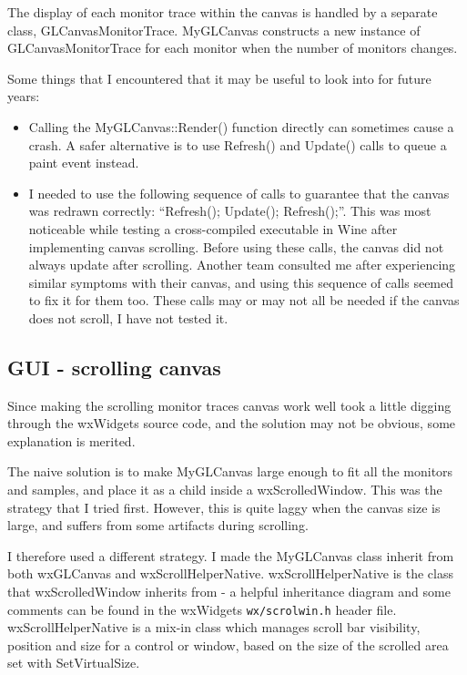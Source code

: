 \documentclass[a4paper,10pt]{article}
\begin{document}
The display of each monitor trace within the canvas is handled by a separate class, GLCanvasMonitorTrace. MyGLCanvas constructs a new instance of GLCanvasMonitorTrace for each monitor when the number of monitors changes. 

Some things that I encountered that it may be useful to look into for future years:
\begin{itemize}
 \item Calling the MyGLCanvas::Render() function directly can sometimes cause a crash. A safer alternative is to use Refresh() and Update() calls to queue a paint event instead. 
 \item I needed to use the following sequence of calls to guarantee that the canvas was redrawn correctly: ``Refresh(); Update(); Refresh();''. This was most noticeable while testing a cross-compiled executable in Wine after implementing canvas scrolling. Before using these calls, the canvas did not always update after scrolling. Another team consulted me after experiencing similar symptoms with their canvas, and using this sequence of calls seemed to fix it for them too. These calls may or may not all be needed if the canvas does not scroll, I have not tested it.
\end{itemize}

\subsection{GUI - scrolling canvas}
Since making the scrolling monitor traces canvas work well took a little digging through the wxWidgets source code, and the solution may not be obvious, some explanation is merited. 

The naive solution is to make MyGLCanvas large enough to fit all the monitors and samples, and place it as a child inside a wxScrolledWindow. This was the strategy that I tried first. However, this is quite laggy when the canvas size is large, and suffers from some artifacts during scrolling. 

I therefore used a different strategy. I made the MyGLCanvas class inherit from both wxGLCanvas and wxScrollHelperNative. wxScrollHelperNative is the class that wxScrolledWindow inherits from - a helpful inheritance diagram and some comments can be found in the wxWidgets \texttt{wx/scrolwin.h} header file. wxScrollHelperNative is a mix-in class which manages scroll bar visibility, position and size for a control or window, based on the size of the scrolled area set with SetVirtualSize. 
\end{document}
